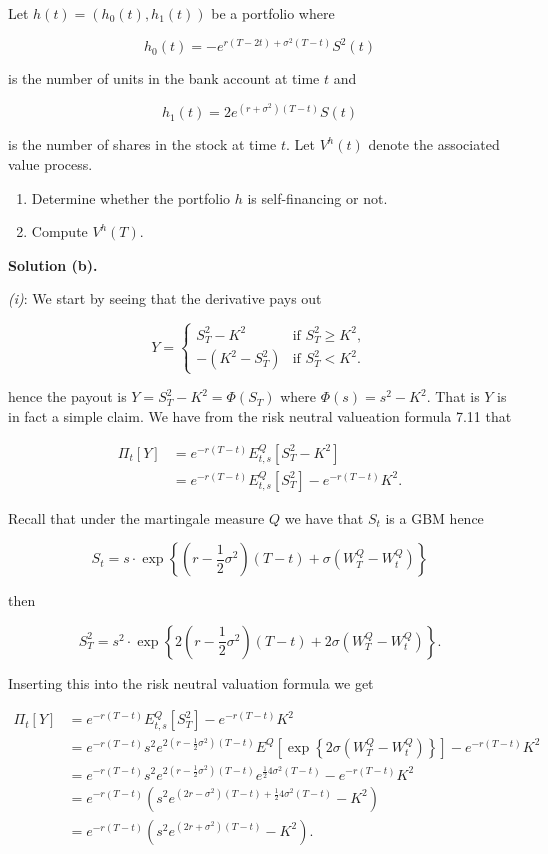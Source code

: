 \documentclass[
]{book}
\providecommand{\tightlist}{%
  \setlength{\itemsep}{0pt}\setlength{\parskip}{0pt}}
\begin{document}
Let \(h(t)=(h_0(t),h_1(t))\) be a portfolio where

\[
h_0(t)=-e^{r(T-2t)+\sigma^2(T-t)}S^2(t)
\]

is the number of units in the bank account at time \(t\) and

\[
h_1(t)=2e^{(r+\sigma^2)(T-t)}S(t)
\]

is the number of shares in the stock at time \(t\). Let \(V^h(t)\) denote the associated value process.

\begin{enumerate}
\def\labelenumi{\alph{enumi}.}
\setcounter{enumi}{2}
\tightlist
\item
  Determine whether the portfolio \(h\) is self-financing or not.
\item
  Compute \(V^h(T)\).
\end{enumerate}

\textbf{Solution (b).}

\emph{(i)}: We start by seeing that the derivative pays out

\[
Y=
\begin{cases}
  S_T^2-K^2 & \text{if }S_T^2\ge K^2,\\
  -(K^2-S_T^2) &\text{if }S_T^2< K^2.
\end{cases}
\]

hence the payout is \(Y=S_T^2-K^2=\Phi(S_T)\) where \(\Phi(s)=s^2-K^2\). That is \(Y\) is in fact a simple claim. We have from the risk neutral valueation formula 7.11 that

\begin{align*}
\Pi_t[Y]&=e^{-r(T-t)}E^Q_{t,s}[S_T^2-K^2]\\
&=e^{-r(T-t)}E^Q_{t,s}[S_T^2]-e^{-r(T-t)}K^2.
\end{align*}

Recall that under the martingale measure \(Q\) we have that \(S_t\) is a GBM hence

\[
S_t=s\cdot \exp\left\{\left(r-\frac{1}{2}\sigma^2\right)(T-t)+\sigma\left(W_T^Q-W_t^Q\right)\right\}
\]

then

\[
S_T^2=s^2\cdot \exp\left\{2\left(r-\frac{1}{2}\sigma^2\right)(T-t)+2\sigma\left(W_T^Q-W_t^Q\right)\right\}.
\]

Inserting this into the risk neutral valuation formula we get

\begin{align*}
\Pi_t[Y]&=e^{-r(T-t)}E^Q_{t,s}[S_T^2]-e^{-r(T-t)}K^2\\
&=e^{-r(T-t)}s^2e^{2\left(r-\frac{1}{2}\sigma^2\right)(T-t)} E^Q\left[\exp\left\{2\sigma\left(W_T^Q-W_t^Q\right)\right\}\right]-e^{-r(T-t)}K^2\\
&=e^{-r(T-t)}s^2e^{2\left(r-\frac{1}{2}\sigma^2\right)(T-t)}e^{\frac{1}{2}4\sigma^2(T-t)}-e^{-r(T-t)}K^2\\
&=e^{-r(T-t)}\left(s^2e^{(2r-\sigma^2)(T-t)+\frac{1}{2}4\sigma^2(T-t)}-K^2\right)\\
&=e^{-r(T-t)}\left(s^2e^{(2r+\sigma^2)(T-t)}-K^2\right).
\end{align*}
\end{document}
